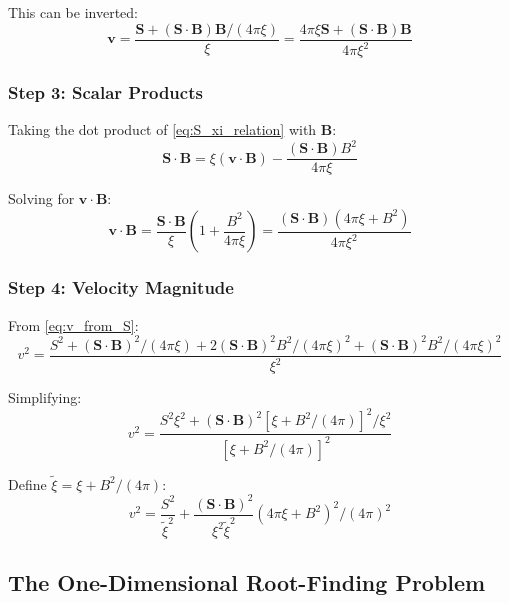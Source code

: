 \documentclass[12pt,a4paper]{article}
\begin{document}
This can be inverted:
\begin{equation}
\bm{v} = \frac{\bm{S} + (\bm{S} \cdot \bm{B})\bm{B}/(4\pi \xi)}{\xi}
= \frac{4\pi \xi \bm{S} + (\bm{S} \cdot \bm{B})\bm{B}}{4\pi \xi^2}
\label{eq:v_from_S}
\end{equation}

\subsubsection{Step 3: Scalar Products}

Taking the dot product of \eqref{eq:S_xi_relation} with $\bm{B}$:
\begin{equation}
\bm{S} \cdot \bm{B} = \xi (\bm{v} \cdot \bm{B}) - \frac{(\bm{S} \cdot \bm{B}) B^2}{4\pi \xi}
\end{equation}

Solving for $\bm{v} \cdot \bm{B}$:
\begin{equation}
\bm{v} \cdot \bm{B} = \frac{\bm{S} \cdot \bm{B}}{\xi}\left(1 + \frac{B^2}{4\pi \xi}\right)
= \frac{(\bm{S} \cdot \bm{B})(4\pi \xi + B^2)}{4\pi \xi^2}
\label{eq:vdotB}
\end{equation}

\subsubsection{Step 4: Velocity Magnitude}

From \eqref{eq:v_from_S}:
\begin{equation}
v^2 = \frac{S^2 + (\bm{S} \cdot \bm{B})^2/(4\pi\xi) + 2(\bm{S} \cdot \bm{B})^2 B^2/(4\pi\xi)^2
+ (\bm{S} \cdot \bm{B})^2 B^2/(4\pi\xi)^2}{\xi^2}
\end{equation}

Simplifying:
\begin{equation}
v^2 = \frac{S^2 \xi^2 + (\bm{S} \cdot \bm{B})^2[\xi + B^2/(4\pi)]^2/\xi^2}{[\xi + B^2/(4\pi)]^2}
\label{eq:v_squared}
\end{equation}

Define $\tilde{\xi} = \xi + B^2/(4\pi)$:
\begin{equation}
v^2 = \frac{S^2}{\tilde{\xi}^2} + \frac{(\bm{S} \cdot \bm{B})^2}{\xi^2 \tilde{\xi}^2}(4\pi \xi + B^2)^2/(4\pi)^2
\label{eq:v2_final}
\end{equation}

\subsection{The One-Dimensional Root-Finding Problem}
\end{document}
